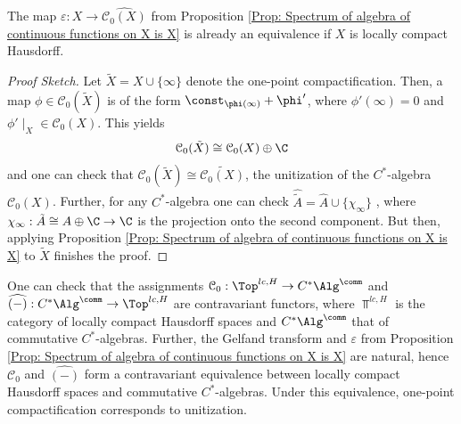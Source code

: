 \documentclass[american]{scrartcl}
\newcommand{\cC}{\mathcal{C}}
\newcommand{\eps}{\varepsilon}
\begin{document}
\begin{proposition}
	The map $\eps: X\to \widehat{\cC_0(X)}$ from Proposition \ref{Prop: Spectrum of algebra of continuous functions on X is X} is already an equivalence if $X$ is locally compact Hausdorff.
\end{proposition}
\begin{proof}[Proof Sketch]
	Let $\tilde{X}=X\cup \{\infty\}$ denote the one-point compactification. Then, a map $\phi\in \cC_0(\tilde{X})$ is of the form $\const_{\phi(\infty)}+\phi'$, where $\phi'(\infty)=0$ and $\phi'\mid_X\in \cC_0(X)$. This yields
	\begin{align*}
		\cC_0(\tilde{X})\cong \cC_0(X)\oplus\C
	\end{align*}
	and one can check that $\cC_0(\tilde{X})\cong \widetilde{\cC_0(X)}$, the unitization of the $C^*$-algebra $\cC_0(X)$. Further, for any $C^*$-algebra one can check $\hat{\tilde{A}}=\hat{A}\cup\{\chi_\infty\}$ , where $\chi_\infty:\tilde{A}\cong A\oplus\C\to \C$ is the projection onto the second component. But then, applying Proposition \ref{Prop: Spectrum of algebra of continuous functions on X is X} to $\tilde{X}$ finishes the proof.
\end{proof}
\begin{remark}
	One can check that the assignments $\cC_0:\Top^{lc,H}\to C^*\Alg^{\comm}$ and $\widehat{(-)}:C^*\Alg^{\comm}\to \Top^{lc,H}$ are contravariant functors, where $\Top^{lc,H}$ is the category of locally compact Hausdorff spaces and $C^*\Alg^{\comm}$ that of commutative $C^*$-algebras. Further, the Gelfand transform and $\eps$ from Proposition \ref{Prop: Spectrum of algebra of continuous functions on X is X} are natural, hence $\cC_0$ and $\widehat{(-)}$ form a contravariant equivalence between locally compact Hausdorff spaces and commutative $C^*$-algebras. Under this equivalence, one-point compactification corresponds to unitization.
\end{remark}
\end{document}

